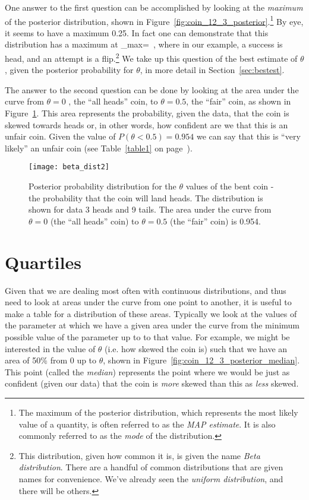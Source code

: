 One answer to the first question can be accomplished by looking at the {\em maximum} of the posterior distribution, shown in Figure~\ref{fig:coin_12_3_posterior}.\footnote{The maximum of the posterior distribution, which represents the most likely value of a quantity, is often referred to as the {\em MAP estimate}.  It is also commonly referred to as the {\em mode} of the distribution.}  By eye, it seems to have a maximum 0.25.  In fact one can demonstrate that this distribution has a maximum at 
\beqn
\theta_{\rm max}= \,,
\eeqn
where in our example, a success is head, and an attempt is a flip.\footnote{This distribution, given how common it is, is given the name {\em Beta distribution}.  There are a handful of common distributions that are given names for convenience.  We've already seen the {\em uniform distribution}, and there will be others.}  We take up this question of the best estimate of $\theta$, given the posterior probability for $\theta$, in more detail in Section~\ref{sec:bestest}.

The answer to the second question can be done by looking at the area under the curve from  $\theta=0$ , the ``all heads'' coin, to $\theta=0.5$, the ``fair'' coin, as shown in Figure~\ref{fig:coin_12_3_posterior_significance}.  This area represents the probability, given the data, that the coin is skewed towards heads or, in other words, how confident are we that this is an unfair coin.  Given the value of $P(\theta<0.5) = 0.954$ we can say that this is ``very likely'' an unfair coin (see Table~\ref{table1} on page~\pageref{table1}). 


\begin{figure}
\texttt{[image: beta\_dist2]}
\caption{Posterior probability distribution for the $\theta$ values of the bent coin - the probability that the coin will land heads.  The distribution is shown for data 3 heads and 9 tails.  The area under the curve from  $\theta=0$ (the ``all heads'' coin) to $\theta=0.5$ (the ``fair'' coin) is 0.954.}
\label{fig:coin_12_3_posterior_significance}
\end{figure}

\section{Quartiles}

Given that we are dealing most often with continuous distributions, and thus need to look at areas under the curve from one point to another, it is useful to make a table for a distribution of these areas.  Typically we look at the values of the parameter at which we have a given area under the curve from the minimum possible value of the parameter up to to that value.  For example, we might be interested in the value of $\theta$ (i.e. how skewed the coin is) such that we have an area of 50\% from 0 up to $\theta$, shown in Figure~\ref{fig:coin_12_3_posterior_median}. This point (called the {\em median}) represents the point where we would be just as confident (given our data) that the coin is {\em more} skewed than this as {\em less} skewed.  

